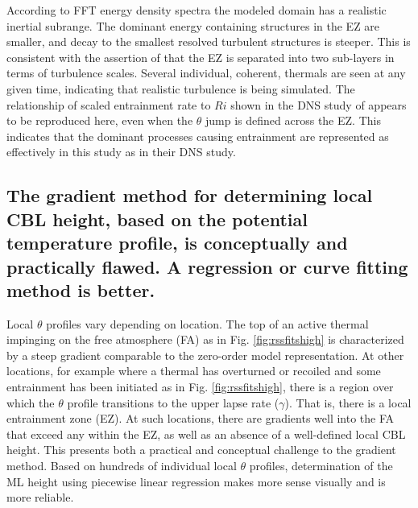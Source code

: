 According to FFT energy density spectra the modeled domain has a realistic inertial subrange.  The dominant energy containing structures in the EZ are smaller, and decay to the smallest resolved turbulent structures is steeper. This is consistent with the assertion of \cite{GarciaMellado} that the EZ is separated into two sub-layers in terms of turbulence scales.  Several individual, coherent, thermals are seen at any given time, indicating that realistic turbulence is being simulated.  The relationship of scaled entrainment rate to $Ri$ shown in the DNS study of \cite{GarciaMellado} appears to be reproduced here, even when the $\theta$ jump is defined across the EZ.  This indicates that the dominant processes causing entrainment are represented as effectively in this study as in their DNS study.

\subsection{The gradient method for determining local CBL height, based on the potential temperature profile, is conceptually and practically flawed.  A regression or curve fitting method is better.}

Local $\theta$ profiles vary depending on location.  The top of an active thermal impinging on the free atmosphere (FA) as in Fig. \ref{fig:rssfitshigh} is characterized by a steep gradient comparable to the zero-order model representation.  At other locations, for example where a thermal has overturned or recoiled and some entrainment has been initiated as in Fig. \ref{fig:rssfitshigh}, there is a region over which the $\theta$ profile transitions to the upper lapse rate ($\gamma$). That is, there is a local entrainment zone (EZ).  At such locations, there are gradients well into the FA that exceed any within the EZ, as well as an absence of a well-defined local CBL height.  This presents both a practical and conceptual challenge to the gradient method.  Based on hundreds of individual local $\theta$ profiles, determination of the ML height using piecewise linear regression makes more sense visually and is more reliable. 

